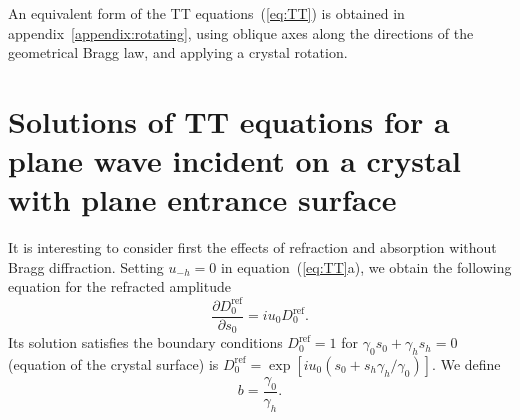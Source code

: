 \documentclass[preprint]{iucr}              %
\begin{document}
An equivalent form of the TT equations~(\ref{eq:TT}) is obtained in appendix~\ref{appendix:rotating}, using oblique axes along the directions of the geometrical Bragg law, and applying a crystal rotation.



%
\section{Solutions of TT equations  for a plane wave incident on a crystal with plane entrance surface}
\label{sec:TTsolutions}

It is interesting to consider first the effects of refraction and absorption without Bragg diffraction. 
Setting $u_{-h}=0$ in equation~(\ref{eq:TT}a), we obtain the following equation for the refracted amplitude 
\begin{equation}\label{eq:refraction}
\frac{\partial D_0^{\text{ref}}}{\partial s_0} = i u_0 D_0^{\text{ref}}.
\end{equation}
Its solution satisfies the boundary conditions $D_0^{\text{ref}}=1$ for  $\gamma_0 s_0 + \gamma_h s_h =0$ (equation of the crystal surface) is $D_0^{\text{ref}}= \exp[i u_0 (s_0 + s_h \gamma_h/\gamma_0)]$.
We define
\begin{equation}\label{eq:b}
b = \frac{\gamma_0}{\gamma_h}.    
\end{equation}
\end{document}
